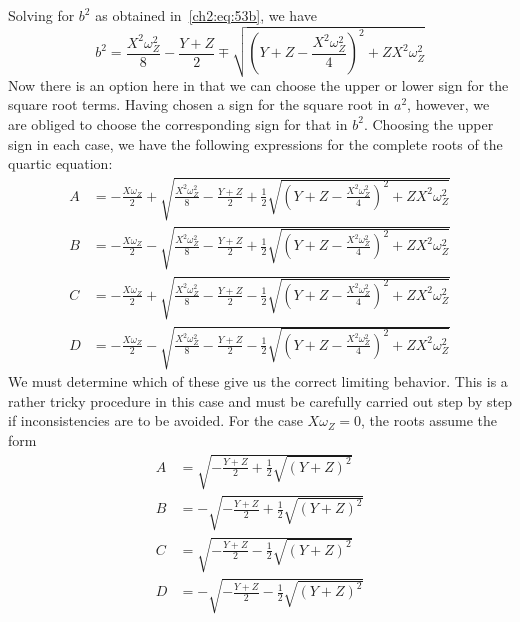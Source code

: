 Solving for $b^2$ as obtained in~\eqref{ch2:eq:53b}, we
have
\begin{equation*}
b^2 = \frac{X^2\omega_Z^2}{8} - \frac{Y + Z}{2}
  \mp \sqrt{\left(Y + Z - \frac{X^2\omega_Z^2}{4}\right)^2 + ZX^2\omega_Z^2}
\end{equation*}
Now there is an option here in that we can choose the upper or lower sign for
the square root terms. Having chosen a sign for the square root in $a^2$,
however, we are obliged to choose the corresponding sign for that in $b^2$.
Choosing the upper sign in each case, we have the following expressions for
the complete roots of the quartic equation:
\begin{equation}\label{ch2:eq:54}
\begin{aligned}
A &= -\frac{X\omega_Z}{2} + \sqrt{\frac{X^2\omega_Z^2}{8} - \frac{Y + Z}{2}
  + \tfrac{1}{2}\sqrt{\left(Y + Z - \frac{X^2\omega_Z^2}{4}\right)^2
  + ZX^2\omega_Z^2}}\\
B &= -\frac{X\omega_Z}{2} - \sqrt{\frac{X^2\omega_Z^2}{8} - \frac{Y + Z}{2}
  + \tfrac{1}{2}\sqrt{\left(Y + Z - \frac{X^2\omega_Z^2}{4}\right)^2
  + ZX^2\omega_Z^2}}\\
C &= -\frac{X\omega_Z}{2} + \sqrt{\frac{X^2\omega_Z^2}{8} - \frac{Y + Z}{2}
  - \tfrac{1}{2}\sqrt{\left(Y + Z - \frac{X^2\omega_Z^2}{4}\right)^2
  + ZX^2\omega_Z^2}}\\
D &= -\frac{X\omega_Z}{2} - \sqrt{\frac{X^2\omega_Z^2}{8} - \frac{Y + Z}{2}
  - \tfrac{1}{2}\sqrt{\left(Y + Z - \frac{X^2\omega_Z^2}{4}\right)^2
  + ZX^2\omega_Z^2}}
\end{aligned}
\end{equation}
We must determine which of these give us the correct limiting behavior. This
is a rather tricky procedure in this case and must be carefully carried out
step by step if inconsistencies are to be avoided. For the case
$X\omega_Z = 0$, the roots assume the form
\begin{align*}
A &= \sqrt{-\frac{Y + Z}{2} + \tfrac{1}{2}\sqrt{(Y + Z)^2}}\\
B &= -\sqrt{-\frac{Y + Z}{2} + \tfrac{1}{2}\sqrt{(Y + Z)^2}}\\
C &= \sqrt{-\frac{Y + Z}{2} - \tfrac{1}{2}\sqrt{(Y + Z)^2}}\\
D &= -\sqrt{-\frac{Y + Z}{2} - \tfrac{1}{2}\sqrt{(Y + Z)^2}}
\end{align*}
